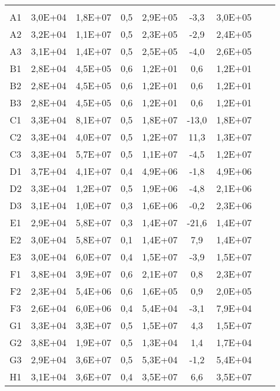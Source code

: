 \begin{center}
\begin{longtable}{ccccccccc}
\toprule
\endhead
\midrule \\ %
\endfoot
\bottomrule 
\endlastfoot
    A1    & 3,0E+04 & 1,8E+07 & 0,5   & 2,9E+05 & -3,3  & 3,0E+05 \\
    A2    & 3,2E+04 & 1,1E+07 & 0,5   & 2,3E+05 & -2,9  & 2,4E+05 \\
    A3    & 3,1E+04 & 1,4E+07 & 0,5   & 2,5E+05 & -4,0  & 2,6E+05 \\
    B1    & 2,8E+04 & 4,5E+05 & 0,6   & 1,2E+01 & 0,6   & 1,2E+01 \\
    B2    & 2,8E+04 & 4,5E+05 & 0,6   & 1,2E+01 & 0,6   & 1,2E+01 \\
    B3    & 2,8E+04 & 4,5E+05 & 0,6   & 1,2E+01 & 0,6   & 1,2E+01 \\
    C1    & 3,3E+04 & 8,1E+07 & 0,5   & 1,8E+07 & -13,0 & 1,8E+07 \\
    C2    & 3,3E+04 & 4,0E+07 & 0,5   & 1,2E+07 & 11,3  & 1,3E+07 \\
    C3    & 3,3E+04 & 5,7E+07 & 0,5   & 1,1E+07 & -4,5  & 1,2E+07 \\
    D1    & 3,7E+04 & 4,1E+07 & 0,4   & 4,9E+06 & -1,8  & 4,9E+06 \\
    D2    & 3,3E+04 & 1,2E+07 & 0,5   & 1,9E+06 & -4,8  & 2,1E+06 \\
    D3    & 3,1E+04 & 1,0E+07 & 0,3   & 1,6E+06 & -0,2  & 2,3E+06 \\
    E1    & 2,9E+04 & 5,8E+07 & 0,3   & 1,4E+07 & -21,6 & 1,4E+07 \\
    E2    & 3,0E+04 & 5,8E+07 & 0,1   & 1,4E+07 & 7,9   & 1,4E+07 \\
    E3    & 3,0E+04 & 6,0E+07 & 0,4   & 1,5E+07 & -3,9  & 1,5E+07 \\
    F1    & 3,8E+04 & 3,9E+07 & 0,6   & 2,1E+07 & 0,8   & 2,3E+07 \\
    F2    & 2,3E+04 & 5,4E+06 & 0,6   & 1,6E+05 & 0,9   & 2,0E+05 \\
    F3    & 2,6E+04 & 6,0E+06 & 0,4   & 5,4E+04 & -3,1  & 7,9E+04 \\
    G1    & 3,3E+04 & 3,3E+07 & 0,5   & 1,5E+07 & 4,3   & 1,5E+07 \\
    G2    & 3,8E+04 & 1,9E+07 & 0,5   & 1,3E+04 & 1,4   & 1,7E+04 \\
    G3    & 2,9E+04 & 3,6E+07 & 0,5   & 5,3E+04 & -1,2  & 5,4E+04 \\
    H1    & 3,1E+04 & 3,6E+07 & 0,4   & 3,5E+07 & 6,6   & 3,5E+07 \\

\end{longtable}
\end{center}
